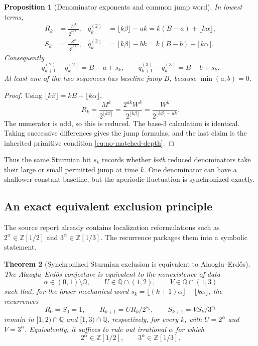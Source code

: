 \documentclass[11pt,oneside]{article}
\newtheorem{theorem}{Theorem}[section]
\newtheorem{proposition}[theorem]{Proposition}
\theoremstyle{definition}
\theoremstyle{remark}
\newcommand{\Z}{\mathbb Z}
\newcommand{\Q}{\mathbb Q}
\begin{document}
\begin{proposition}[Denominator exponents and common jump word]\label{prop:denominators}
In lowest terms,
\begin{align}
  R_k&=\frac{W^k}{2^{q^{(2)}_k}},
  &q^{(2)}_k&=\lfloor k\beta\rfloor-ak
              =k(B-a)+\lfloor k\alpha\rfloor,\label{eq:q2}\\
  S_k&=\frac{Z^k}{3^{q^{(3)}_k}},
  &q^{(3)}_k&=\lfloor k\beta\rfloor-bk
              =k(B-b)+\lfloor k\alpha\rfloor.\label{eq:q3}
\end{align}
Consequently
\[
  q^{(2)}_{k+1}-q^{(2)}_k=B-a+s_k,
  \qquad
  q^{(3)}_{k+1}-q^{(3)}_k=B-b+s_k.
\]
At least one of the two sequences has baseline jump $B$, because $\min(a,b)=0$.
\end{proposition}

\begin{proof}
Using $\lfloor k\beta\rfloor=kB+\lfloor k\alpha\rfloor$,
\[
 R_k=\frac{M^k}{2^{\lfloor k\beta\rfloor}}
     =\frac{2^{ak}W^k}{2^{\lfloor k\beta\rfloor}}
     =\frac{W^k}{2^{\lfloor k\beta\rfloor-ak}}.
\]
The numerator is odd, so this is reduced.  The base-$3$ calculation is identical.  Taking
successive differences gives the jump formulas, and the last claim is the inherited
primitive condition \eqref{eq:no-matched-depth}.
\end{proof}

Thus the same Sturmian bit $s_k$ records whether \emph{both} reduced denominators take their
large or small permitted jump at time $k$.  One denominator can have a shallower constant
baseline, but the aperiodic fluctuation is synchronized exactly.

\subsection{An exact equivalent exclusion principle}

The source report already contains localization reformulations such as
$2^\alpha\in\Z[1/2]$ and $3^\alpha\in\Z[1/3]$.  The recurrence packages them into a symbolic
statement.

\begin{theorem}[Synchronized Sturmian exclusion is equivalent to Alaoglu--Erd\H{o}s]
\label{thm:sturmian-equivalence}
The Alaoglu--Erd\H{o}s conjecture is equivalent to the nonexistence of data
\[
  \alpha\in(0,1)\setminus\Q,
  \qquad
  U\in\Q\cap(1,2),
  \qquad
  V\in\Q\cap(1,3)
\]
such that, for the lower mechanical word
$s_k=\lfloor(k+1)\alpha\rfloor-\lfloor k\alpha\rfloor$, the recurrences
\[
  R_0=S_0=1,
  \qquad R_{k+1}=UR_k/2^{s_k},
  \qquad S_{k+1}=VS_k/3^{s_k}
\]
remain in $[1,2)\cap\Q$ and $[1,3)\cap\Q$, respectively, for every $k$, with
$U=2^\alpha$ and $V=3^\alpha$.
Equivalently, it suffices to rule out irrational $\alpha$ for which
\[
  2^\alpha\in\Z[1/2],
  \qquad
  3^\alpha\in\Z[1/3].
\]
\end{theorem}
\end{document}
